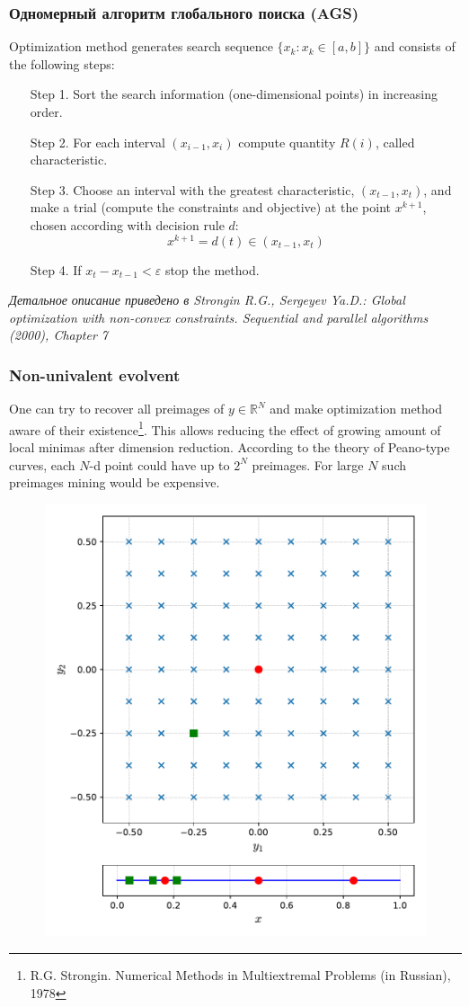 \documentclass[aspectratio=1610]{beamer}
\begin{document}
\begin{frame}
  \frametitle{Одномерный алгоритм глобального поиска (AGS)}
  Optimization method generates search sequence \(\{x_k:x_k\in[a,b]\}\) and consists of the following steps:
  \begin{enumerate}
    \setlength{\itemindent}{.1in}
    \item[Step 1.] Sort the search information (one-dimensional points) in increasing order.
    \item[Step 2.] For each interval \((x_{i-1}, x_i)\) compute quantity \(R(i)\), called characteristic.
    \item[Step 3.] Choose an interval with the greatest characteristic, \((x_{t-1}, x_{t})\), and
    make a trial (compute the constraints and objective) at the point \(x^{k+1}\), chosen according with decision rule \(d\):
    \begin{displaymath}
      x^{k+1}=d(t)\in (x_{t-1}, x_{t})
    \end{displaymath}
    \item[Step 4.] If \(x_{t}-x_{t-1}<\varepsilon\) stop the method.
  \end{enumerate}
  \textit{\footnotesize	{Детальное описание приведено в Strongin R.G., Sergeyev Ya.D.: Global optimization with non-convex constraints. Sequential and parallel algorithms (2000), Chapter 7}}
\end{frame}

\begin{frame}
  \frametitle{Non-univalent evolvent}
    One can try to recover all preimages of \(y\in\mathbb{R}^N\) and make optimization method aware of their existence\footnote{R.G. Strongin. Numerical Methods in Multiextremal Problems (in Russian), 1978}. This allows reducing the effect of growing amount of local minimas after dimension reduction.
    According to the theory of Peano-type curves, each \(N\)-d point could have up to \(2^N\) preimages. For large \(N\) such preimages mining would be expensive.
      \begin{figure}[ht]
        \includegraphics[width=.25\textwidth]{evolvents/noninjective.pdf}
      \end{figure}
\end{frame}
\end{document}
